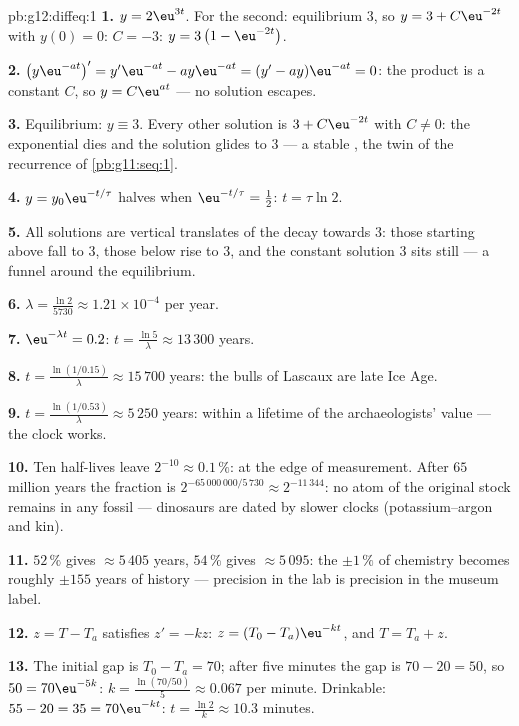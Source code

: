 \begin{solution}{pb:g12:diffeq:1}
\textbf{1.} $y = 2\eu^{3t}$. For the second: equilibrium $3$,
so $y = 3 + C\eu^{-2t}$ with $y(0) = 0$: $C = -3$:
$y = 3\left(1 - \eu^{-2t}\right)$.

\textbf{2.} $\left(y\eu^{-at}\right)' = y'\eu^{-at} -
ay\eu^{-at} = (y' - ay)\eu^{-at} = 0$: the product is a
constant $C$, so $y = C\eu^{at}$ --- no solution escapes.

\textbf{3.} Equilibrium: $y \equiv 3$. Every other solution is
$3 + C\eu^{-2t}$ with $C \neq 0$: the exponential dies and the
solution glides to $3$ --- a stable , the
 twin of the recurrence  of
\cref{pb:g11:seq:1}.

\textbf{4.} $y = y_0\eu^{-t/\tau}$ halves when
$\eu^{-t/\tau} = \frac12$: $t = \tau\ln 2$.

\textbf{5.} All solutions are vertical translates of the decay
towards $3$: those starting above fall to $3$, those below
rise to $3$, and the constant solution $3$ sits still --- a
funnel around the equilibrium.

\textbf{6.} $\lambda = \frac{\ln 2}{5730} \approx 1.21 \times
10^{-4}$ per year.

\textbf{7.} $\eu^{-\lambda t} = 0.2$:
$t = \frac{\ln 5}{\lambda} \approx 13\,300$ years.

\textbf{8.} $t = \frac{\ln(1/0.15)}{\lambda} \approx 15\,700$
years: the bulls of Lascaux are late Ice Age.

\textbf{9.} $t = \frac{\ln(1/0.53)}{\lambda} \approx 5\,250$
years: within a lifetime of the archaeologists' value ---
the clock works.

\textbf{10.} Ten half-lives leave $2^{-10} \approx 0.1\,\%$:
at the edge of measurement. After $65$ million years the
fraction is $2^{-65\,000\,000/5\,730} \approx 2^{-11\,344}$:
no atom of the original stock remains in any fossil ---
dinosaurs are dated by slower clocks (potassium--argon and
kin).

\textbf{11.} $52\,\%$ gives $\approx 5\,405$ years,
$54\,\%$ gives $\approx 5\,095$: the $\pm 1\,\%$ of chemistry
becomes roughly $\pm 155$ years of history --- precision in
the lab is precision in the museum label.

\textbf{12.} $z = T - T_a$ satisfies $z' = -kz$:
$z = (T_0 - T_a)\eu^{-kt}$, and $T = T_a + z$.

\textbf{13.} The initial gap is $T_0 - T_a = 70$; after five
minutes the gap is $70 - 20 = 50$, so $50 = 70\eu^{-5k}$:
$k = \frac{\ln(70/50)}{5} \approx 0.067$ per minute. Drinkable:
$55 - 20 = 35 = 70\eu^{-kt}$:
$t = \frac{\ln 2}{k} \approx 10.3$ minutes.


\end{solution}
